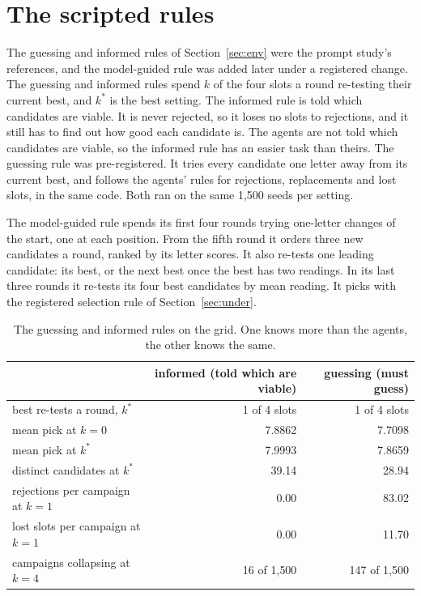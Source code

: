 \section{The scripted rules}
\label{app:refs}

The guessing and informed rules of Section~\ref{sec:env} were the prompt study's references, and the model-guided
rule was added later under a registered change. The guessing and informed rules spend $k$ of the four slots a round
re-testing their current best, and $k^\ast$ is the best setting. The informed rule is told which candidates are
viable. It is never rejected, so it loses no slots to rejections, and it still has to find out how good each candidate is. The agents are not told
which candidates are viable, so the informed rule has an easier task than theirs. The guessing rule was pre-registered. It tries every candidate one letter away from its current best, and follows the agents' rules for rejections,
replacements and lost slots, in the same code. Both ran on the same 1{,}500 seeds per setting.

The model-guided rule spends its first four rounds trying one-letter changes of the start, one at each position. From
the fifth round it orders three new candidates a round, ranked by its letter scores. It also re-tests one leading candidate: its best, or the next best once the best has two readings. In its last three rounds it re-tests its four
best candidates by mean reading. It picks with the registered selection rule of Section~\ref{sec:under}.

\begin{table}[h]
\centering
\small
\caption{The guessing and informed rules on the grid. One knows more than the agents, the other knows the same.}
\begin{tabular}{lrr}
\toprule
 & informed (told which are viable) & guessing (must guess) \\
\midrule
best re-tests a round, $k^\ast$     & 1 of 4 slots & 1 of 4 slots \\
mean pick at $k{=}0$                & 7.8862 & 7.7098 \\
mean pick at $k^\ast$               & 7.9993 & 7.8659 \\
distinct candidates at $k^\ast$     & 39.14  & 28.94 \\
rejections per campaign at $k{=}1$  & 0.00   & 83.02 \\
lost slots per campaign at $k{=}1$  & 0.00   & 11.70 \\
campaigns collapsing at $k{=}4$     & 16 of 1{,}500 & 147 of 1{,}500 \\
\bottomrule
\end{tabular}
\end{table}

